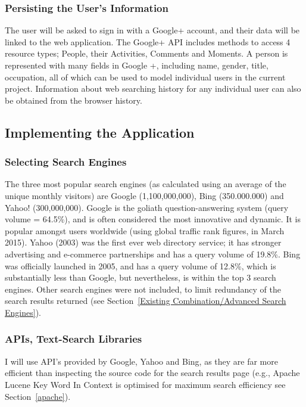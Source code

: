 \documentclass[10pt]{article}
\begin{document}
\subsubsection{Persisting the User's Information}
The user will be asked to sign in with a Google+ account, and their data will be linked to the web application. The Google+ API includes methods to access 4 resource  types; People, their Activities, Comments and Moments. A person is represented with many fields in Google +, including name, gender, title, occupation, all of which can be used to model individual users in the current project. Information about web searching history for any individual user can also be obtained from the browser history. 

\subsection{Implementing the Application}\label{api}
\subsubsection{Selecting Search Engines} 
The three most popular search engines (as calculated using an average of the unique monthly visitors) are Google (1,100,000,000), Bing (350.000.000) and Yahoo! (300,000,000)\cite{ebiz}. Google is the goliath question-answering system (query volume = 64.5\%)\cite{adam}, and is often considered the most innovative and dynamic. It is popular amongst users worldwide (using global traffic rank figures, in March 2015). Yahoo (2003) was the first ever web directory service; it has stronger advertising and e-commerce partnerships and has a query volume of 19.8\%. Bing was officially launched in 2005, and has a query volume of 12.8\%, which is substantially less than Google, but nevertheless, is within the top 3 search engines. Other search engines were not included, to limit redundancy of the search results returned (see Section~\ref{Existing Combination/Advanced Search Engines}). 

\subsubsection{APIs, Text-Search Libraries}
I will use API’s provided by Google, Yahoo and Bing, as they are far more efficient than inspecting the source code for the search results page (e.g., Apache Lucene Key Word In Context is optimised for maximum search efficiency see Section~\ref{apache}). 
\end{document}
